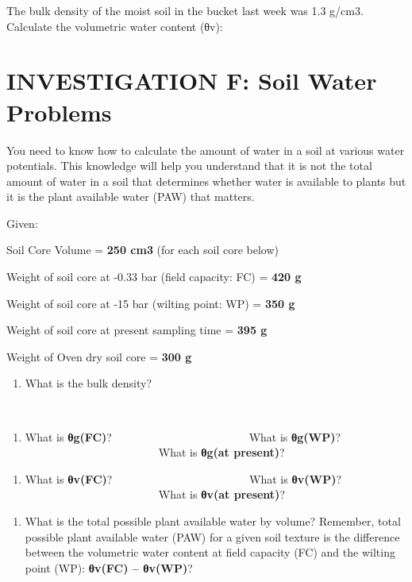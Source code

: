 \documentclass[
  letterpaper,
  twocolumn,
  portrait]{scrbook}
\providecommand{\tightlist}{%
  \setlength{\itemsep}{0pt}\setlength{\parskip}{0pt}}\usepackage{longtable,booktabs,array}
\begin{document}
The bulk density of the moist soil in the bucket last week was 1.3
g/cm3. Calculate the volumetric water content (θv):

\hypertarget{investigation-f-soil-water-problems}{%
\section{INVESTIGATION F: Soil Water
Problems}\label{investigation-f-soil-water-problems}}

You need to know how to calculate the amount of water in a soil at
various water potentials. This knowledge will help you understand that
it is not the total amount of water in a soil that determines whether
water is available to plants but it is the plant available water (PAW)
that matters.

Given:

Soil Core Volume = \textbf{250 cm3} (for each soil core below)

Weight of soil core at -0.33 bar (field capacity: FC) = \textbf{420 g}

Weight of soil core at -15 bar (wilting point: WP) = \textbf{350 g}

Weight of soil core at present sampling time = \textbf{395 g}

Weight of Oven dry soil core = \textbf{300 g}

\begin{enumerate}
\def\labelenumi{\arabic{enumi}.}
\tightlist
\item
  What is the bulk density?
\end{enumerate}

~ ~ ~

\begin{enumerate}
\def\labelenumi{\arabic{enumi}.}
\setcounter{enumi}{1}
\tightlist
\item
  What is \textbf{θg(FC)}? ~~~~~~~~~~~~~~~~~~~~~~~~What is
  \textbf{θg(WP)}? ~~~~~~~~~~~~~~~~~~~~~~~~What is \textbf{θg(at
  present)}?
\end{enumerate}

\begin{enumerate}
\def\labelenumi{\arabic{enumi}.}
\setcounter{enumi}{2}
\tightlist
\item
  What is \textbf{θv(FC)}? ~~~~~~~~~~~~~~~~~~~~~~~~What is
  \textbf{θv(WP)}? ~~~~~~~~~~~~~~~~~~~~~~~~What is \textbf{θv(at
  present)}?
\end{enumerate}

\begin{enumerate}
\def\labelenumi{\arabic{enumi}.}
\setcounter{enumi}{3}
\tightlist
\item
  What is the total possible plant available water by volume? Remember,
  total possible plant available water (PAW) for a given soil texture is
  the difference between the volumetric water content at field capacity
  (FC) and the wilting point (WP): \textbf{θv(FC) -- θv(WP)}?
\end{enumerate}
\end{document}
